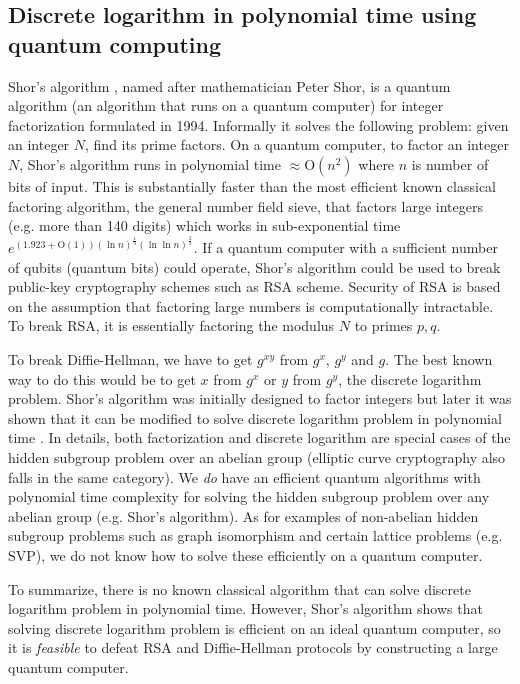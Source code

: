 \subsection{Discrete logarithm in polynomial time using quantum computing}
Shor's algorithm \cite{Shor:1997:PAP:264393.264406}, named after mathematician Peter Shor, is a quantum algorithm (an algorithm that runs on a quantum computer) for integer factorization formulated in 1994. Informally it solves the following problem: given an integer $N$, find its prime factors. On a quantum computer, to factor an integer $N$, Shor's algorithm runs in polynomial time $\approx \text{O}(n^2)$ where $n$ is number of bits of input. This is substantially faster than the most efficient known classical factoring algorithm, the general number field sieve, that factors large integers (e.g. more than 140 digits) which works in sub-exponential time $e^{(1.923 + \text{O}(1)) (\ln{n})^{\frac{1}{3}} (\ln{\ln{n}})^{\frac{2}{3}}}$. If a quantum computer with a sufficient number of qubits (quantum bits) could operate, Shor's algorithm could be used to break public-key cryptography schemes such as RSA scheme. Security of RSA is based on the assumption that factoring large numbers is computationally intractable. To break RSA, it is essentially factoring the modulus $N$ to primes $p,q$.

To break Diffie-Hellman, we have to get $g^{x  y}$ from $g^x$, $g^y$ and $g$. The best known way to do this would be to get $x$ from $g^x$ or $y$ from $g^y$, the discrete logarithm problem. Shor's algorithm was initially designed to factor integers but later it was shown that it can be modified to solve discrete logarithm problem in polynomial time \cite{Boneh1995}. In details, both factorization and discrete logarithm are special cases of the hidden subgroup problem over an abelian group (elliptic curve cryptography also falls in the same category). We \textit{do} have an efficient quantum algorithms with polynomial time complexity for solving the hidden subgroup problem over any abelian group (e.g. Shor's algorithm). As for examples of non-abelian hidden subgroup problems such as graph isomorphism and certain lattice problems (e.g. $\mathrm{SVP}$), we do not know how to solve these efficiently on a quantum computer. 


To summarize, there is no known classical algorithm that can solve discrete logarithm problem in polynomial time. However, Shor's algorithm shows that solving discrete logarithm problem is efficient on an ideal quantum computer, so it is \textit{feasible} to defeat RSA and Diffie-Hellman protocols by constructing a large quantum computer.

